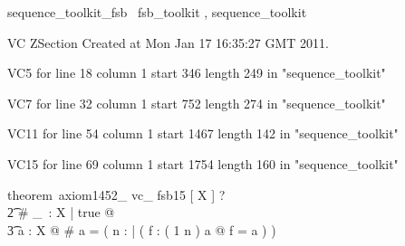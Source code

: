 \documentclass{article}
\begin{document}

\begin{zsection}
	 \SECTION sequence\_toolkit\_fsb \parents~fsb\_toolkit , sequence\_toolkit
\end{zsection}

VC ZSection Created at Mon Jan 17 16:35:27 GMT 2011.

VC5 for line 18 column 1 start 346 length 249 in "sequence_toolkit"

VC7 for line 32 column 1 start 752 length 274 in "sequence_toolkit"

VC11 for line 54 column 1 start 1467 length 142 in "sequence_toolkit"

VC15 for line 69 column 1 start 1754 length 160 in "sequence_toolkit"
\begin{zed}
theorem~axiom1452\_ vc\_ fsb15 [ X ] \vdash ? \\
   \t2 \exists \# \_~: \finset X \fun \nat | true @ \\
    \t3 \forall a : \finset X @ \# a = ( \mu n : \nat | ( \exists f : ( 1 \upto n ) \inj a @ \ran f = a ) )
\end{zed}
\end{document}
